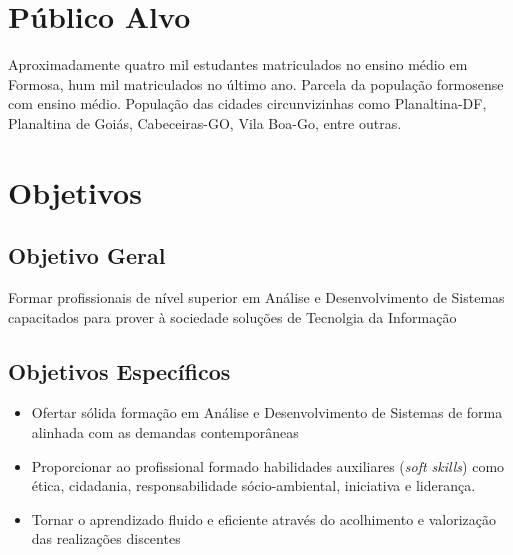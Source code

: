 \documentclass[
	10pt,				%
	openright,			%
	twoside,			%
	a4paper,			%
	english,			%
	french,				%
	brazil,				%
	sumario=tradicional
]{abntex2}
\begin{document}
\section*{Público Alvo}

Aproximadamente quatro mil estudantes matriculados no ensino médio em Formosa, hum mil matriculados no último ano.
Parcela da população formosense com ensino médio.
População das cidades circunvizinhas como Planaltina-DF, Planaltina de Goiás, Cabeceiras-GO, Vila Boa-Go, entre outras.


\section*{Objetivos}\label{objetivos}

\subsection*{Objetivo Geral}

Formar profissionais de nível superior em Análise e Desenvolvimento de Sistemas capacitados para prover à sociedade soluções de Tecnolgia da Informação

\subsection*{Objetivos Específicos}

\begin{itemize}
	\item Ofertar sólida formação em Análise e Desenvolvimento de Sistemas de forma alinhada com as demandas contemporâneas
	\item Proporcionar ao profissional formado habilidades auxiliares (\textit{soft skills}) como ética, cidadania, responsabilidade sócio-ambiental, iniciativa e liderança.
	\item Tornar o aprendizado fluido e eficiente através do acolhimento e valorização das realizações discentes
\end{itemize}
\end{document}
